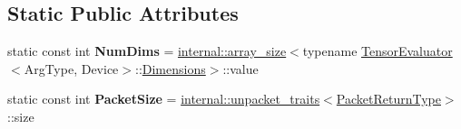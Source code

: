 \subsection*{Static Public Attributes}
\begin{DoxyCompactItemize}
\item 
\mbox{\label{struct_eigen_1_1_tensor_evaluator_3_01const_01_tensor_inflation_op_3_01_strides_00_01_arg_type_01_4_00_01_device_01_4_a00a52d5884cc6d5565ec94af2e9ad9a3}} 
static const int {\bfseries Num\+Dims} = \hyperlink{struct_eigen_1_1internal_1_1array__size}{internal\+::array\+\_\+size}$<$typename \hyperlink{struct_eigen_1_1_tensor_evaluator}{Tensor\+Evaluator}$<$Arg\+Type, Device$>$\+::\hyperlink{struct_eigen_1_1_d_sizes}{Dimensions}$>$\+::value
\item 
\mbox{\label{struct_eigen_1_1_tensor_evaluator_3_01const_01_tensor_inflation_op_3_01_strides_00_01_arg_type_01_4_00_01_device_01_4_a9417367837278faa02f44761b4d08e51}} 
static const int {\bfseries Packet\+Size} = \hyperlink{struct_eigen_1_1internal_1_1unpacket__traits}{internal\+::unpacket\+\_\+traits}$<$\hyperlink{group___sparse_core___module}{Packet\+Return\+Type}$>$\+::size
\end{DoxyCompactItemize}
